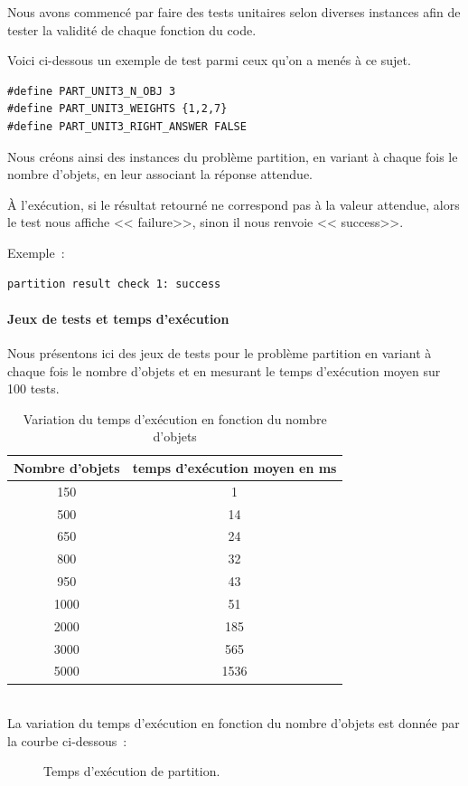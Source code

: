 \documentclass[a4paper, 12pt]{article}
\begin{document}
Nous avons commencé par faire des tests unitaires selon diverses
instances afin de tester la validité de chaque fonction du code.

Voici ci-dessous un exemple de test parmi ceux qu'on a menés à ce sujet.
\begin{lstlisting}
#define PART_UNIT3_N_OBJ 3
#define PART_UNIT3_WEIGHTS {1,2,7}
#define PART_UNIT3_RIGHT_ANSWER FALSE
\end{lstlisting}

Nous créons ainsi des instances du problème partition, en variant à chaque fois le nombre d'objets, en leur associant la réponse attendue.

À l'exécution, si le résultat retourné ne correspond pas à la valeur attendue, alors le test nous affiche << failure>>, sinon il nous renvoie << success>>.

Exemple~:
\begin{lstlisting}
partition result check 1: success
\end{lstlisting}

\paragraph{Jeux de tests et temps d'exécution}

Nous présentons ici des jeux de tests pour le problème partition en variant à chaque fois le nombre d'objets et en mesurant le temps d'exécution moyen sur 100 tests.
\begin{table}[h!]
\centering
\begin{tabular}{|c|c|}
\hline
Nombre d'objets & temps d'exécution moyen en ms\\
\hline
150 & 1\\
\hline
500 & 14\\
\hline
650 & 24\\
\hline
800 & 32\\
\hline
950 & 43\\
\hline
1000 & 51\\
\hline
2000 & 185\\
\hline
3000 & 565\\
\hline
5000 & 1536\\
\hline
\end{tabular}
\caption {Variation du temps d'exécution en fonction du nombre d'objets}
\end{table}\\
La variation du temps d'exécution en fonction du nombre d'objets est donnée par la courbe ci-dessous~:
\begin{figure}[h!]
\centering
{}
\caption{Temps d'exécution de partition.}
\end{figure}
\end{document}
